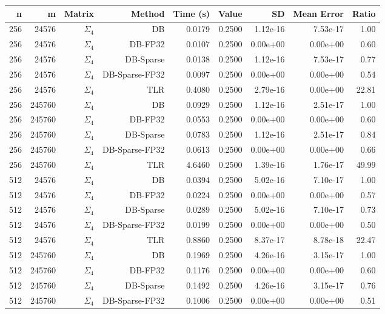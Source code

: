 \begin{tabular}{|r|r|r|r|r|r|r|r|r|}
  \hline
  \textbf{n} & \textbf{m} & \textbf{Matrix} & \textbf{Method} & \textbf{Time (s)} & \textbf{Value} & \textbf{SD} & \textbf{Mean Error} & \textbf{Ratio} \\
  \hline
  256 & 24576 & $\Sigma_4$ & DB & 0.0179 & 0.2500 & 1.12e-16 & 7.53e-17 & 1.00 \\
  256 & 24576 & $\Sigma_4$ & DB-FP32 & 0.0107 & 0.2500 & 0.00e+00 & 0.00e+00 & 0.60 \\
  256 & 24576 & $\Sigma_4$ & DB-Sparse & 0.0138 & 0.2500 & 1.12e-16 & 7.53e-17 & 0.77 \\
  256 & 24576 & $\Sigma_4$ & DB-Sparse-FP32 & 0.0097 & 0.2500 & 0.00e+00 & 0.00e+00 & 0.54 \\
  256 & 24576 & $\Sigma_4$ & TLR & 0.4080 & 0.2500 & 2.79e-16 & 0.00e+00 & 22.81 \\
  256 & 245760 & $\Sigma_4$ & DB & 0.0929 & 0.2500 & 1.12e-16 & 2.51e-17 & 1.00 \\
  256 & 245760 & $\Sigma_4$ & DB-FP32 & 0.0553 & 0.2500 & 0.00e+00 & 0.00e+00 & 0.60 \\
  256 & 245760 & $\Sigma_4$ & DB-Sparse & 0.0783 & 0.2500 & 1.12e-16 & 2.51e-17 & 0.84 \\
  256 & 245760 & $\Sigma_4$ & DB-Sparse-FP32 & 0.0613 & 0.2500 & 0.00e+00 & 0.00e+00 & 0.66 \\
  256 & 245760 & $\Sigma_4$ & TLR & 4.6460 & 0.2500 & 1.39e-16 & 1.76e-17 & 49.99 \\
  512 & 24576 & $\Sigma_4$ & DB & 0.0394 & 0.2500 & 5.02e-16 & 7.10e-17 & 1.00 \\
  512 & 24576 & $\Sigma_4$ & DB-FP32 & 0.0224 & 0.2500 & 0.00e+00 & 0.00e+00 & 0.57 \\
  512 & 24576 & $\Sigma_4$ & DB-Sparse & 0.0289 & 0.2500 & 5.02e-16 & 7.10e-17 & 0.73 \\
  512 & 24576 & $\Sigma_4$ & DB-Sparse-FP32 & 0.0199 & 0.2500 & 0.00e+00 & 0.00e+00 & 0.50 \\
  512 & 24576 & $\Sigma_4$ & TLR & 0.8860 & 0.2500 & 8.37e-17 & 8.78e-18 & 22.47 \\
  512 & 245760 & $\Sigma_4$ & DB & 0.1969 & 0.2500 & 4.26e-16 & 3.15e-17 & 1.00 \\
  512 & 245760 & $\Sigma_4$ & DB-FP32 & 0.1176 & 0.2500 & 0.00e+00 & 0.00e+00 & 0.60 \\
  512 & 245760 & $\Sigma_4$ & DB-Sparse & 0.1492 & 0.2500 & 4.26e-16 & 3.15e-17 & 0.76 \\
  512 & 245760 & $\Sigma_4$ & DB-Sparse-FP32 & 0.1006 & 0.2500 & 0.00e+00 & 0.00e+00 & 0.51 \\

\end{tabular}
